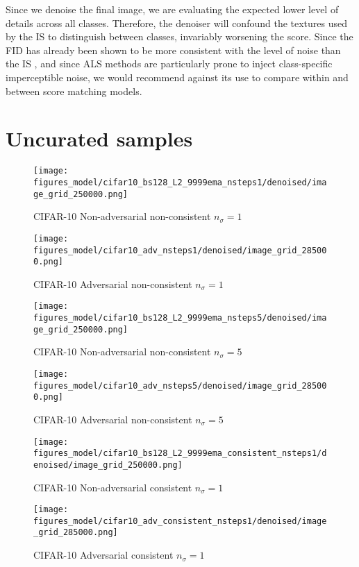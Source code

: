 \documentclass{article} \usepackage{iclr2021_conference_notitle,times}
\theoremstyle{definition}
\theoremstyle{definition}
\begin{document}
Since we denoise the final image, we are evaluating the expected lower level of details across all classes. Therefore, the denoiser will confound the textures used by the IS to distinguish between classes, invariably worsening the score. Since the FID has already been shown to be more consistent with the level of noise than the IS \citep{heusel2017gans}, and since ALS methods are particularly prone to inject class-specific imperceptible noise, we would recommend against its use to compare within and between score matching models.










\newpage
\section{Uncurated samples}

\begin{figure}[ht] 
    \centering
    \texttt{[image: figures\_model/cifar10\_bs128\_L2\_9999ema\_nsteps1/denoised/image\_grid\_250000.png]}
    \caption{CIFAR-10 Non-adversarial non-consistent $n_\sigma=1$} 
\end{figure}
\begin{figure}[ht] 
    \centering
    \texttt{[image: figures\_model/cifar10\_adv\_nsteps1/denoised/image\_grid\_285000.png]}
    \caption{CIFAR-10 Adversarial non-consistent $n_\sigma=1$} 
\end{figure}

\begin{figure}[ht] 
    \centering
    \texttt{[image: figures\_model/cifar10\_bs128\_L2\_9999ema\_nsteps5/denoised/image\_grid\_250000.png]}
    \caption{CIFAR-10 Non-adversarial non-consistent $n_\sigma=5$} 
\end{figure}
\begin{figure}[ht] 
    \centering
    \texttt{[image: figures\_model/cifar10\_adv\_nsteps5/denoised/image\_grid\_285000.png]}
    \caption{CIFAR-10 Adversarial non-consistent $n_\sigma=5$} 
\end{figure}

\begin{figure}[ht] 
    \centering
    \texttt{[image: figures\_model/cifar10\_bs128\_L2\_9999ema\_consistent\_nsteps1/denoised/image\_grid\_250000.png]}
    \caption{CIFAR-10 Non-adversarial consistent $n_\sigma=1$} 
\end{figure}
\begin{figure}[ht] 
    \centering
    \texttt{[image: figures\_model/cifar10\_adv\_consistent\_nsteps1/denoised/image\_grid\_285000.png]}
    \caption{CIFAR-10 Adversarial consistent $n_\sigma=1$} 
\end{figure}
\end{document}
